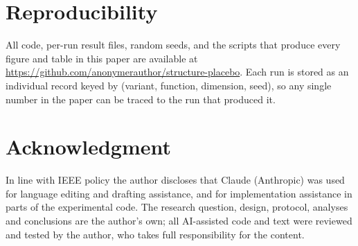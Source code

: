 \documentclass[lettersize,journal]{IEEEtran}
\begin{document}





\section*{Reproducibility}
All code, per-run result files, random seeds, and the scripts that produce
every figure and table in this paper are available at
\url{https://github.com/anonymerauthor/structure-placebo}. Each run is stored as an individual
record keyed by (variant, function, dimension, seed), so any single number
in the paper can be traced to the run that produced it.

\section*{Acknowledgment}
In line with IEEE policy the author discloses that Claude (Anthropic) was used
for language editing and drafting assistance, and for implementation assistance
in parts of the experimental code. The research question, design, protocol,
analyses and conclusions are the author's own; all AI-assisted code and text
were reviewed and tested by the author, who takes full responsibility for the
content.



\end{document}

